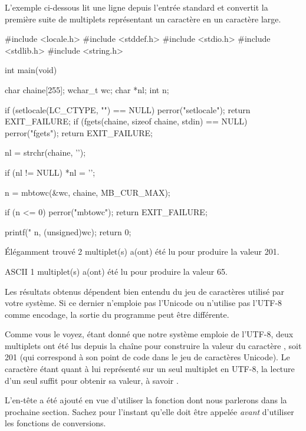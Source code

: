 L'exemple ci-dessous lit une ligne depuis l'entrée standard et convertit
la première suite de multiplets représentant un caractère en un
caractère large.

\begin{C}
#include <locale.h>
#include <stddef.h>
#include <stdio.h>
#include <stdlib.h>
#include <string.h>


int main(void)
{
    char chaine[255];
    wchar_t wc;
    char *nl;
    int n;

    if (setlocale(LC_CTYPE, "") == NULL)
    {
        perror("setlocale");
        return EXIT_FAILURE;
    }
    if (fgets(chaine, sizeof chaine, stdin) == NULL)
    {
        perror("fgets");
        return EXIT_FAILURE;
    }

    nl = strchr(chaine, '\n');

    if (nl != NULL)
        *nl = '\0';

    n = mbtowc(&wc, chaine, MB_CUR_MAX);

    if (n <= 0)
    {
        perror("mbtowc");
        return EXIT_FAILURE;
    }


    printf("%
    n, (unsigned)wc);
    return 0;
}
\end{C}

\begin{C}
Élégamment trouvé
2 multiplet(s) a(ont) été lu pour produire la valeur 201.

ASCII
1 multiplet(s) a(ont) été lu pour produire la valeur 65.
\end{C}

\begin{infobox}
  Les résultats obtenus dépendent bien
entendu du jeu de caractères utilisé par votre système. Si ce dernier
n'emploie pas l'Unicode ou n'utilise pas l'UTF-8 comme encodage, la
sortie du programme peut être différente.
\end{infobox}


Comme vous le voyez, étant donné que notre système emploie de l'UTF-8,
deux multiplets ont été lus depuis la chaîne  pour
construire la valeur du caractère , soit 201 (qui correspond à
son point de code dans le jeu de caractères Unicode). Le caractère
 étant quant à lui représenté sur un seul multiplet en UTF-8,
la lecture d'un seul suffit pour obtenir sa valeur, à savoir
.

L'en-tête  a été ajouté en vue
d'utiliser la fonction  dont nous parlerons dans la
prochaine section. Sachez pour l'instant qu'elle doit être appelée
\emph{avant} d'utiliser les fonctions de conversions.

